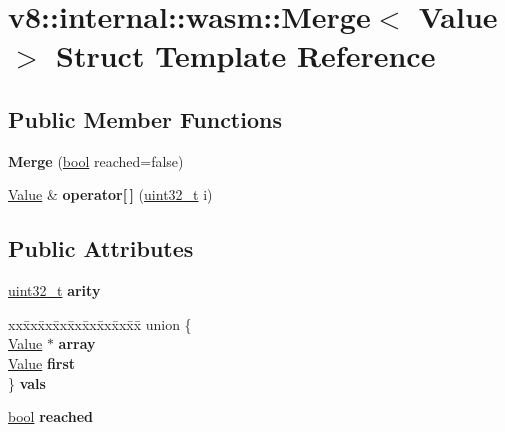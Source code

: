\hypertarget{structv8_1_1internal_1_1wasm_1_1Merge}{}\section{v8\+:\+:internal\+:\+:wasm\+:\+:Merge$<$ Value $>$ Struct Template Reference}
\label{structv8_1_1internal_1_1wasm_1_1Merge}
\subsection*{Public Member Functions}
\begin{DoxyCompactItemize}
\item 
\mbox{\label{structv8_1_1internal_1_1wasm_1_1Merge_aaff0304c1a6946b2eb63bbaaea32465d}} 
{\bfseries Merge} (\mbox{\hyperlink{classbool}{bool}} reached=false)
\item 
\mbox{\label{structv8_1_1internal_1_1wasm_1_1Merge_a352cbf58ee3b15fdf3defd326584494a}} 
\mbox{\hyperlink{classv8_1_1Value}{Value}} \& {\bfseries operator\mbox{[}$\,$\mbox{]}} (\mbox{\hyperlink{classuint32__t}{uint32\+\_\+t}} i)
\end{DoxyCompactItemize}
\subsection*{Public Attributes}
\begin{DoxyCompactItemize}
\item 
\mbox{\label{structv8_1_1internal_1_1wasm_1_1Merge_afeef103beb7e1adbe3361b6311bc5466}} 
\mbox{\hyperlink{classuint32__t}{uint32\+\_\+t}} {\bfseries arity}
\item 
\mbox{\label{structv8_1_1internal_1_1wasm_1_1Merge_aa374e8a5bca1c3db26934615345777e7}} 
\begin{tabbing}
xx\=xx\=xx\=xx\=xx\=xx\=xx\=xx\=xx\=\kill
union \{\\
\>\mbox{\hyperlink{classv8_1_1Value}{Value}} $\ast$ {\bfseries array}\\
\>\mbox{\hyperlink{classv8_1_1Value}{Value}} {\bfseries first}\\
\} {\bfseries vals}\\

\end{tabbing}\item 
\mbox{\label{structv8_1_1internal_1_1wasm_1_1Merge_a06fc65818e465dc7d00bfc5479ce6cab}} 
\mbox{\hyperlink{classbool}{bool}} {\bfseries reached}
\end{DoxyCompactItemize}


